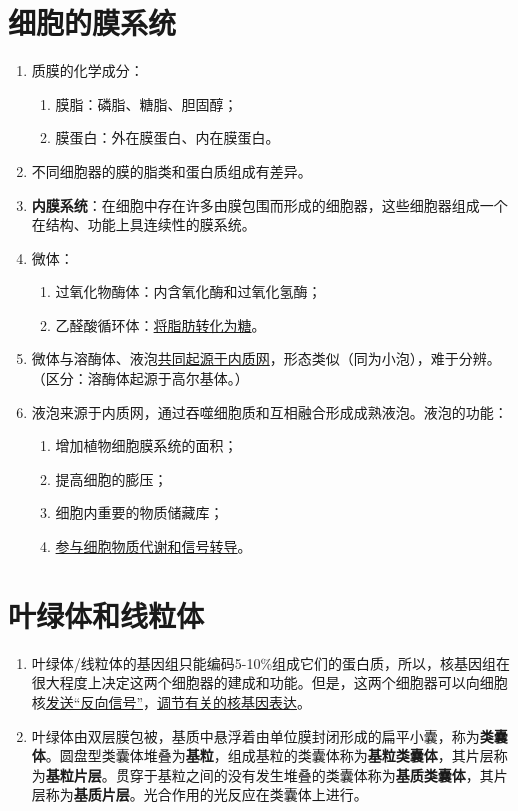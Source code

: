 \section{细胞的膜系统}
\begin{enumerate}
    \item 质膜的化学成分：
    \begin{enumerate}
        \item 膜脂：磷脂、糖脂、胆固醇；
        \item 膜蛋白：外在膜蛋白、内在膜蛋白。
    \end{enumerate}
    \item 不同细胞器的膜的脂类和蛋白质组成有差异。
    \item \textbf{内膜系统}：在细胞中存在许多由膜包围而形成的细胞器，这些细胞器组成一个在结构、功能上具连续性的膜系统。
    \item 微体：
    \begin{enumerate}
        \item 过氧化物酶体：内含氧化酶和过氧化氢酶；
        \item 乙醛酸循环体：\uline{将脂肪转化为糖}。
    \end{enumerate}
    \item 微体与溶酶体、液泡\uline{共同起源于内质网}，形态类似（同为小泡），难于分辨。（区分：溶酶体起源于高尔基体。）
    \item 液泡来源于内质网，通过吞噬细胞质和互相融合形成成熟液泡。液泡的功能：
    \begin{enumerate}
        \item 增加植物细胞膜系统的面积；
        \item 提高细胞的膨压；
        \item 细胞内重要的物质储藏库；
        \item \uline{参与细胞物质代谢和信号转导}。
    \end{enumerate}
\end{enumerate}

\section{叶绿体和线粒体}
\begin{enumerate}
    \item 叶绿体/线粒体的基因组只能编码5-10\%组成它们的蛋白质，所以，核基因组在很大程度上决定这两个细胞器的建成和功能。但是，这两个细胞器可以向细胞核\uline{发送“反向信号”}，\uline{调节有关的核基因表达}。
    \item 叶绿体由双层膜包被，基质中悬浮着由单位膜封闭形成的扁平小囊，称为\textbf{类囊体}。圆盘型类囊体堆叠为\textbf{基粒}，组成基粒的类囊体称为\textbf{基粒类囊体}，其片层称为\textbf{基粒片层}。贯穿于基粒之间的没有发生堆叠的类囊体称为\textbf{基质类囊体}，其片层称为\textbf{基质片层}。光合作用的光反应在类囊体上进行。
\end{enumerate}

